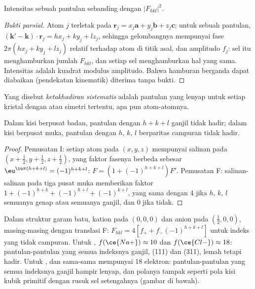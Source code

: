 \begin{proposition}[Intensitas]\label{prop:b3:x-ray-diffraction:intensity}
Intensitas sebuah pantulan sebanding dengan $|F_{hkl}|^2$.
\end{proposition}

\begin{proof}[Bukti parsial]
Atom $j$ terletak pada $\mathbf r_j = x_j\mathbf a + y_j\mathbf b + z_j\mathbf c$; untuk sebuah
pantulan, $(\mathbf k' - \mathbf k)\cdot\mathbf r_j = hx_j + ky_j + lz_j$, sehingga
gelombangnya mempunyai fase $2\pi(hx_j + ky_j + lz_j)$ relatif terhadap atom di
titik asal, dan amplitudo $f_j$: sel itu menghamburkan jumlah $F_{hkl}$, dan
setiap sel menghamburkan hal yang sama. Intensitas adalah kuadrat modulus
amplitudo. Bahwa hamburan berganda dapat diabaikan (pendekatan kinematik)
diterima tanpa bukti.
\end{proof}

\begin{definition}\label{def:b3:x-ray-diffraction:absence}
Yang disebut \emph{ketakhadiran sistematis}
adalah pantulan yang  lenyap untuk setiap kristal dengan
 atau simetri tertentu, apa pun atom-atomnya.
\end{definition}

\begin{proposition}\label{prop:b3:x-ray-diffraction:absences}
Dalam kisi berpusat badan, pantulan dengan $h + k + l$ ganjil tidak hadir;
dalam kisi berpusat muka, pantulan dengan $h$, $k$, $l$ berparitas campuran
tidak hadir.
\end{proposition}

\begin{proof}
Pemusatan I: setiap atom pada $(x,y,z)$ mempunyai salinan pada
$(x + \frac12, y + \frac12, z + \frac12)$, yang faktor fasenya berbeda sebesar
$\eu^{\iu\pi(h+k+l)} = (-1)^{h+k+l}$: $F = (1 +
(-1)^{h+k+l})F'$. Pemusatan F: salinan-salinan pada tiga pusat muka memberikan
faktor $1 +
(-1)^{h+k} + (-1)^{h+l} + (-1)^{k+l}$, yang sama dengan 4 jika $h$, $k$, $l$
semuanya genap atau semuanya ganjil, dan 0 jika tidak.
\end{proof}

\begin{example}\label{ex:b3:x-ray-diffraction:nacl-kcl}
Dalam struktur garam batu, kation pada $(0,0,0)$ dan anion pada $(\frac12,0,0)$,
masing-masing dengan translasi F: $F_{hkl} = 4[f_+ + f_-(-1)^{h+k+l}]$ untuk
indeks yang tidak campuran. Untuk , $f(\ce{Na+}) \approx 10$ dan
$f(\ce{Cl-}) \approx 18$: pantulan-pantulan yang semua indeksnya ganjil, (111) dan
(311), lemah tetapi hadir. Untuk ,  dan  sama-sama
mempunyai 18 elektron: pantulan-pantulan yang semua indeksnya ganjil hampir
lenyap, dan polanya tampak seperti pola kisi kubik primitif dengan rusuk sel
setengahnya (gambar di bawah).
\end{example}

